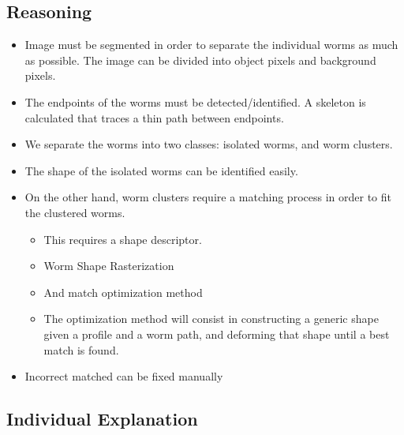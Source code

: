 \documentclass[12pt,letterpaper,oneside]{book}
\begin{document}
\subsection*{Reasoning}
\begin{itemize}
\item Image must be segmented in order to separate the individual
  worms as much as possible. The image can be divided into object
  pixels and background pixels.
\item The endpoints of the worms must be detected/identified. A skeleton
  is calculated that traces a thin path between endpoints.
\item We separate the worms into two classes: isolated worms, and 
  worm clusters.
\item The shape of the isolated worms can be identified easily.
\item On the other hand, worm clusters require a matching process
  in order to fit the clustered worms.
  \begin{itemize}
  \item This requires a shape descriptor. 
  \item Worm Shape Rasterization
  \item And match optimization method
    \item The optimization method will consist in constructing a generic
      shape given a profile and a worm path, and deforming that shape
      until a best match is found.
  \end{itemize}
\item Incorrect matched can be fixed manually

\end{itemize}

\subsection*{Individual Explanation}
\end{document}
